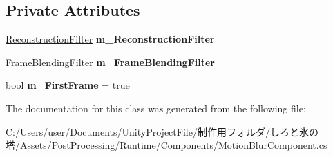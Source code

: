 \subsection*{Private Attributes}
\begin{DoxyCompactItemize}
\item 
\mbox{\label{class_unity_engine_1_1_post_processing_1_1_motion_blur_component_a3b19c244dccf16b77d72bab6fb541e8d}} 
\hyperlink{class_unity_engine_1_1_post_processing_1_1_motion_blur_component_1_1_reconstruction_filter}{Reconstruction\+Filter} {\bfseries m\+\_\+\+Reconstruction\+Filter}
\item 
\mbox{\label{class_unity_engine_1_1_post_processing_1_1_motion_blur_component_afe769fdbff3b2b14f5a4f3dcbe6c9434}} 
\hyperlink{class_unity_engine_1_1_post_processing_1_1_motion_blur_component_1_1_frame_blending_filter}{Frame\+Blending\+Filter} {\bfseries m\+\_\+\+Frame\+Blending\+Filter}
\item 
\mbox{\label{class_unity_engine_1_1_post_processing_1_1_motion_blur_component_ab5e206496b1bb49aa6222cd080169c9b}} 
bool {\bfseries m\+\_\+\+First\+Frame} = true
\end{DoxyCompactItemize}


The documentation for this class was generated from the following file\+:\begin{DoxyCompactItemize}
\item 
C\+:/\+Users/user/\+Documents/\+Unity\+Project\+File/制作用フォルダ/しろと氷の塔/\+Assets/\+Post\+Processing/\+Runtime/\+Components/Motion\+Blur\+Component.\+cs\end{DoxyCompactItemize}
